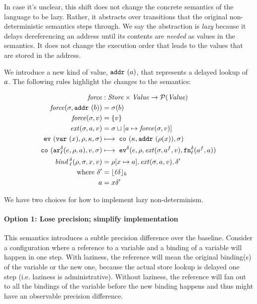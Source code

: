 \documentclass[preprint,onecolumn,9pt]{sigplanconf} %
\begin{document}
In case it's unclear, this shift does not change the concrete semantics of the
language to be lazy.  Rather, it abstracts over transitions that the original
non-deterministic semantics steps through. 
%
We say the abstraction is \emph{lazy} because it delays dereferencing an
address until its contents are \emph{needed} as values in the semantics. It
does not change the execution order that leads to the values that are stored in
the address.

We introduce a new kind of value, ${\tt addr{\ }}({a})$, that represents a
delayed lookup of $a$.  The following rules highlight the
changes to the semantics:

\renewcommand{\ext}{\mathit{ext}}

\begin{align*}
\force &: \Store \times \Value \to \Set(\Value) \\
\force(\msto,\saddr\maddralt) &= \msto(\maddralt)\\
\force(\msto,\mval) &= \{\mval\} \\
\ext(\msto, \maddr, \mval) &= \msto \sqcup[\maddr \mapsto \force(\msto, \mval)] \\
\ev{\svar{\mvar},\menv,\mkont,\msto} &\machstep\;
\co{\mkont,\saddr{\menv(\mvar)},\msto} \\
\co{\kar[^\mcntr_\mlab]{\mexp,\menv,\maddr},\mval,\msto}
&\machstep\;
\ev[^\mcntr]{\mexp,\menv,\ext(\msto, \maddr^f,\mval),\kfn[^\mcntr_\mlab]{\maddr^f,\maddr}} \\
\mathit{bind\,}^\mcntr_\mlab(\menv,\msto,\mvar,\mval) &= \menv[\mvar \mapsto
  \maddr], \ext(\msto,\maddr, \mval), \mcntr' \\
\mbox{where } \mcntr' &= \lfloor\mlab\mcntr\rfloor_k \\
              \maddr &= \mvar\mcntr'
\end{align*}

We have two choices for how to implement lazy non-determinism.

\paragraph{Option 1: Lose precision; simplify implementation}
This semantics introduces a subtle precision difference over the
baseline. Consider a configuration where a reference to a variable and
a binding of a variable will happen in one step. With laziness, the
reference will mean the original binding(s) of the variable or the new
one, because the actual store lookup is delayed one step
(i.e. laziness is administrative). Without laziness, the reference
will fan out to all the bindings of the variable before the new
binding happens and thus might have an observable precision
difference.
\end{document}
